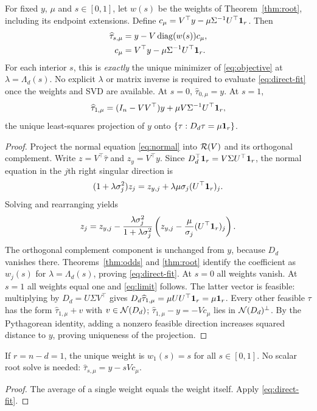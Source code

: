 \begin{theorem}\label{thm:reconstruction}
For fixed $y$, $\mu$ and $s\in[0,1]$, let $w(s)$ be the weights of
Theorem~\ref{thm:root}, including its endpoint extensions. Define
$c_\mu=V^\top y-\mu\Sigma^{-1}U^\top\mathbf 1_r$.
Then
\begin{equation}\label{eq:direct-fit}
\begin{aligned}
\widehat\tau_{s,\mu}&=y-V\operatorname{diag}(w(s))c_\mu,\\
c_\mu&=V^\top y-\mu\Sigma^{-1}U^\top\mathbf 1_r.
\end{aligned}
\end{equation}
For each interior $s$, this is \emph{exactly} the unique minimizer
of \eqref{eq:objective} at $\lambda=\Lambda_d(s)$. No explicit
$\lambda$ or matrix inverse is required to evaluate \eqref{eq:direct-fit}
once the weights and SVD are available.
At $s=0$, $\widehat\tau_{0,\mu}=y$. At $s=1$,
\begin{equation}\label{eq:limit}
\widehat\tau_{1,\mu}
=(I_n-VV^\top)y+\mu V\Sigma^{-1}U^\top\mathbf 1_r,
\end{equation}
the unique least-squares projection of $y$ onto
$\{\tau:D_d\tau=\mu\mathbf 1_r\}$.
\end{theorem}
\begin{proof}
Project the normal equation \eqref{eq:normal} into
$\mathcal R(V)$ and its orthogonal complement. Write
$z=V^\top\widehat\tau$ and $z_y=V^\top y$.
Since $D_d^\top\mathbf 1_r=V\Sigma U^\top\mathbf 1_r$, the normal equation
in the $j$th right singular direction is
\[
(1+\lambda\sigma_j^2)z_j
=z_{y,j}+\lambda\mu\sigma_j(U^\top\mathbf 1_r)_j.
\]
Solving and rearranging yields
\[
z_j=z_{y,j}-
\frac{\lambda\sigma_j^2}{1+\lambda\sigma_j^2}
\left(z_{y,j}-\frac{\mu}{\sigma_j}(U^\top\mathbf 1_r)_j\right).
\]
The orthogonal complement component is unchanged from $y$,
because $D_d$ vanishes there. Theorems~\ref{thm:odds} and
\ref{thm:root} identify the coefficient as $w_j(s)$ for
$\lambda=\Lambda_d(s)$, proving \eqref{eq:direct-fit}.
At $s=0$ all weights vanish. At $s=1$ all weights equal one
and \eqref{eq:limit} follows. The latter vector is feasible:
multiplying by $D_d=U\Sigma V^\top$ gives
$D_d\widehat\tau_{1,\mu}=\mu UU^\top\mathbf 1_r=\mu\mathbf 1_r$.
Every other feasible $\tau$ has the form
$\widehat\tau_{1,\mu}+v$ with $v\in\mathcal N(D_d)$;
$\widehat\tau_{1,\mu}-y=-V c_\mu$ lies in
$\mathcal N(D_d)^\perp$. By the Pythagorean identity, adding a
nonzero feasible direction increases squared distance to $y$,
proving uniqueness of the projection.
\end{proof}

\begin{corollary}\label{cor:r1}
If $r=n-d=1$, the unique weight is $w_1(s)=s$ for all
$s\in[0,1]$. No scalar root solve is needed:
$\widehat\tau_{s,\mu}=y-sVc_\mu$.
\end{corollary}
\begin{proof}
The average of a single weight equals the weight itself.
Apply \eqref{eq:direct-fit}.
\end{proof}
